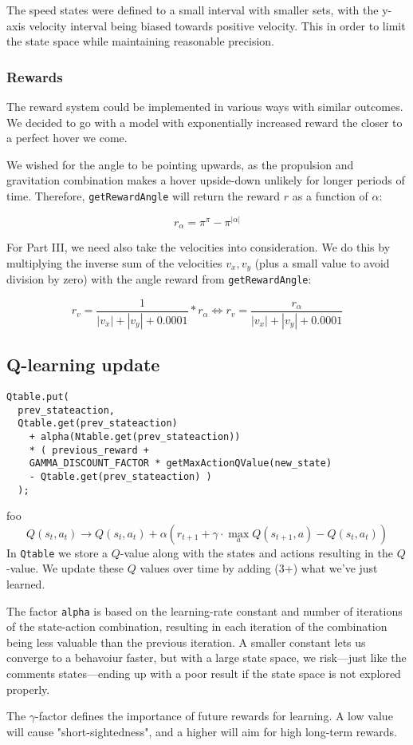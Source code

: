 The speed states were defined to a small interval with smaller sets, with the y-axis velocity interval being biased towards positive velocity. This in order to limit the state space while maintaining reasonable precision.

\subsubsection{Rewards}
The reward system could be implemented in various ways with similar outcomes. We decided to go with a model with exponentially increased reward the closer to a perfect hover we come.

We wished for the angle to be pointing upwards, as the propulsion and gravitation combination makes a hover upside-down unlikely for longer periods of time. Therefore, \verb=getRewardAngle= will return the reward $r$ as a function of $\alpha$:

$$ r_{\alpha} = \pi^{\pi} - \pi^{|\alpha|} $$

For Part III, we need also take the velocities into consideration. We do this by multiplying the inverse sum of the velocities $v_x,v_y$ (plus a small value to avoid division by zero) with the angle reward from \verb=getRewardAngle=:

$$ r_{v} = \frac{1}{|v_x|+|v_y|+0.0001}*r_{\alpha} \Leftrightarrow r_v = \frac{r_{\alpha}}{|v_x|+|v_y|+0.0001} $$

\subsection{Q-learning update}
\lstset{language=Java,numbers=left,breaklines=true,breakatwhitespace=true,keepspaces=true}
\begin{lstlisting}
Qtable.put(
  prev_stateaction,
  Qtable.get(prev_stateaction)
    + alpha(Ntable.get(prev_stateaction))
    * ( previous_reward +
    GAMMA_DISCOUNT_FACTOR * getMaxActionQValue(new_state)
    - Qtable.get(prev_stateaction) )
  );
\end{lstlisting}

foo
$$ Q(s_t,a_t) \rightarrow Q(s_t,a_t)+\alpha \left(r_{t+1}+\gamma\cdot\max_a Q(s_{t+1},a) - Q(s_t,a_t)\right) $$
In \verb=Qtable= we store a $Q$-value along with the states and actions resulting in the $Q$-value. We update these $Q$ values over time by adding (3+) what we've just learned.

The factor \verb=alpha= is based on the learning-rate constant and number of iterations of the state-action combination, resulting in each iteration of the combination being less valuable than the previous iteration. A smaller constant lets us converge to a behavoiur faster, but with a large state space, we risk---just like the comments states---ending up with a poor result if the state space is not explored properly.

The $\gamma$-factor defines the importance of future rewards for learning. A low value will cause "short-sightedness", and a higher will aim for high long-term rewards.
